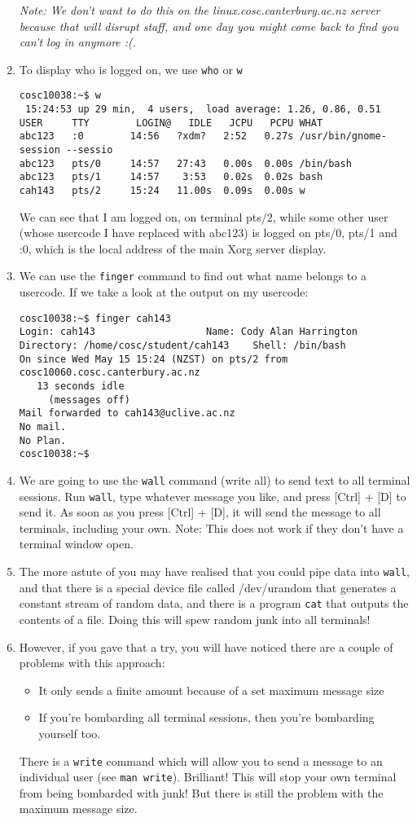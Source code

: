 \documentclass{article}
\begin{document}
\begin{enumerate}
\emph{Note: We don't want to do this on the linux.cosc.canterbury.ac.nz server because that will disrupt staff, and one day you might come back to find you can't log in anymore :(.}
\item To display who is logged on, we use \texttt{who} or \texttt{w}
\begin{verbatim}
cosc10038:~$ w
 15:24:53 up 29 min,  4 users,  load average: 1.26, 0.86, 0.51
USER     TTY        LOGIN@   IDLE   JCPU   PCPU WHAT
abc123   :0        14:56   ?xdm?   2:52   0.27s /usr/bin/gnome-session --sessio
abc123   pts/0     14:57   27:43   0.00s  0.00s /bin/bash
abc123   pts/1     14:57    3:53   0.02s  0.02s bash
cah143   pts/2     15:24   11.00s  0.09s  0.00s w
\end{verbatim}
We can see that I am logged on, on terminal pts/2, while some other user (whose usercode I have replaced with abc123) is logged on pts/0, pts/1 and :0, which is the local address of the main Xorg server display.
\item We can use the \texttt{finger} command to find out what name belongs to a usercode. If we take a look at the output on my usercode:
\begin{verbatim}
cosc10038:~$ finger cah143 
Login: cah143         			Name: Cody Alan Harrington
Directory: /home/cosc/student/cah143	Shell: /bin/bash
On since Wed May 15 15:24 (NZST) on pts/2 from cosc10060.cosc.canterbury.ac.nz
   13 seconds idle
     (messages off)
Mail forwarded to cah143@uclive.ac.nz
No mail.
No Plan.
cosc10038:~$ 
\end{verbatim}
\item We are going to use the \texttt{wall} command (write all) to send text to all terminal sessions. Run \texttt{wall}, type whatever message you like, and press [Ctrl] + [D] to send it. As soon as you press [Ctrl] + [D], it will send the message to all terminals, including your own. Note: This does not work if they don't have a terminal window open.
\item The more astute of you may have realised that you could pipe data into \texttt{wall}, and that there is a special device file called /dev/urandom that generates a constant stream of random data, and there is a program \texttt{cat} that outputs the contents of a file.  Doing this will spew random junk into all terminals!
\item However, if you gave that a try, you will have noticed there are a couple of problems with this approach:
\begin{itemize}
\item It only sends a finite amount because of a set maximum message size
\item If you're bombarding all terminal sessions, then you're bombarding yourself too.
\end{itemize}
There is a \texttt{write} command which will allow you to send a message to an individual user (see \texttt{man write}). Brilliant! This will stop your own terminal from being bombarded with junk! But there is still the problem with the maximum message size. 


\end{enumerate}
\end{document}
